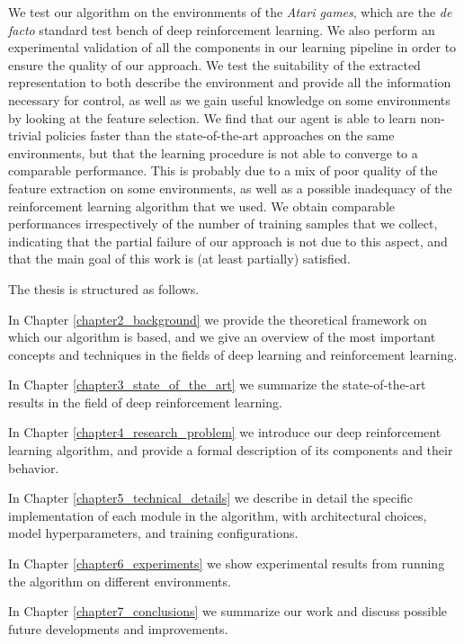 We test our algorithm on the environments of the \textit{Atari games}, which are
the \textit{de facto} standard test bench of deep reinforcement learning. We 
also perform an experimental validation of all the components in our learning 
pipeline in order to ensure the quality of our approach.
We test the suitability of the extracted representation to both describe the 
environment and provide all the information necessary for control, as well as 
we gain useful knowledge on some environments by looking at the feature 
selection.
We find that our agent is able to learn non-trivial policies faster than the
state-of-the-art approaches on the same environments, but that the learning 
procedure is not able to converge to a comparable performance. 
This is probably due to a mix of poor quality of the feature extraction on some 
environments, as well as a possible inadequacy of the reinforcement learning 
algorithm that we used. We obtain comparable performances irrespectively of
the number of training samples that we collect, indicating that the partial
failure of our approach is not due to this aspect, and that the main goal of 
this work is (at least partially) satisfied.

The thesis is structured as follows. 

In Chapter \ref{chapter2_background} we provide the theoretical framework on
which our algorithm is based, and we give an overview of the most important 
concepts and techniques in the fields of deep learning and reinforcement 
learning.

In Chapter \ref{chapter3_state_of_the_art} we summarize the state-of-the-art 
results in the field of deep reinforcement learning.

In Chapter \ref{chapter4_research_problem} we introduce our deep reinforcement 
learning algorithm, and provide a formal description of its components and 
their behavior.

In Chapter \ref{chapter5_technical_details} we describe in detail the specific 
implementation of each module in the algorithm, with architectural choices, 
model hyperparameters, and training configurations.

In Chapter \ref{chapter6_experiments} we show experimental results from running
the algorithm on different environments.

In Chapter \ref{chapter7_conclusions} we summarize our work and discuss possible
future developments and improvements.

